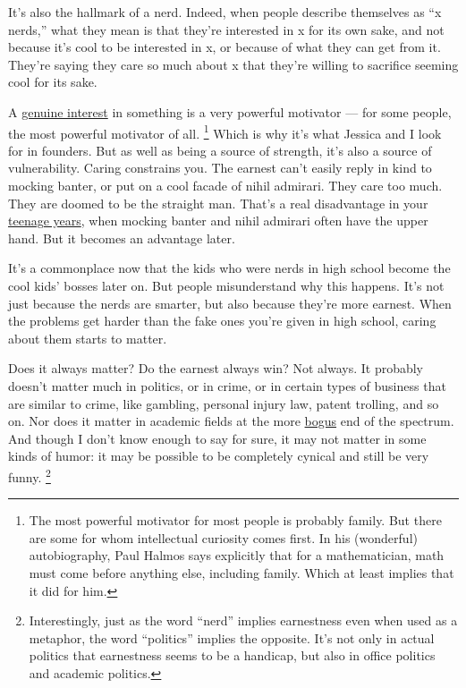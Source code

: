 It's also the hallmark of a nerd. Indeed, when people describe
themselves as ``x nerds,'' what they mean is that they're interested in
x for its own sake, and not because it's cool to be interested in x, or
because of what they can get from it. They're saying they care so much
about x that they're willing to sacrifice seeming cool for its sake.

A \href{genius.html}{genuine interest} in something is a very powerful
motivator --- for some people, the most powerful motivator of all.
\footnote{The most powerful motivator for most people is probably family.
But there are some for whom intellectual curiosity comes first. In his
(wonderful) autobiography, Paul Halmos says explicitly that for a
mathematician, math must come before anything else, including family.
Which at least implies that it did for him.} Which is why it's what Jessica and I look for in
founders. But as well as being a source of strength, it's also a source
of vulnerability. Caring constrains you. The earnest can't easily reply
in kind to mocking banter, or put on a cool facade of nihil admirari.
They care too much. They are doomed to be the straight man. That's a
real disadvantage in your \href{nerds.html}{teenage years}, when mocking
banter and nihil admirari often have the upper hand. But it becomes an
advantage later.

It's a commonplace now that the kids who were nerds in high school
become the cool kids' bosses later on. But people misunderstand why this
happens. It's not just because the nerds are smarter, but also because
they're more earnest. When the problems get harder than the fake ones
you're given in high school, caring about them starts to matter.

Does it always matter? Do the earnest always win? Not always. It
probably doesn't matter much in politics, or in crime, or in certain
types of business that are similar to crime, like gambling, personal
injury law, patent trolling, and so on. Nor does it matter in academic
fields at the more
\href{https://scholar.google.com/scholar?hl=en&as_sdt=0\%2C5&q=hermeneutic+dialectics+hegemonic+phenomenology+intersectionality}{bogus}
end of the spectrum. And though I don't know enough to say for sure, it
may not matter in some kinds of humor: it may be possible to be
completely cynical and still be very funny. \footnote{Interestingly, just as the word ``nerd'' implies earnestness
even when used as a metaphor, the word ``politics'' implies the
opposite. It's not only in actual politics that earnestness seems to be
a handicap, but also in office politics and academic politics.}

